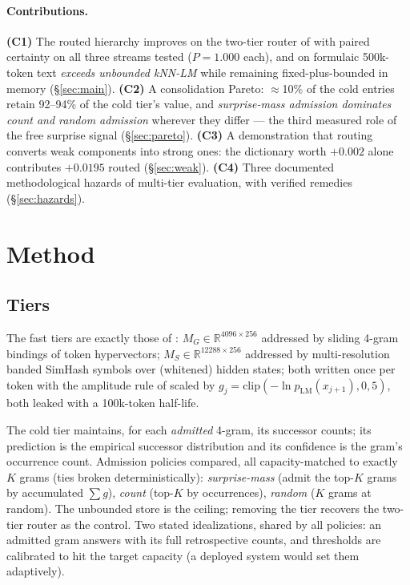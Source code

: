 \documentclass[11pt]{article}
\begin{document}
\paragraph{Contributions.}
\textbf{(C1)} The routed hierarchy improves on the two-tier router of \cite{router} with paired certainty on all three streams tested ($P = 1.000$ each), and on formulaic 500k-token text \emph{exceeds unbounded kNN-LM} while remaining fixed-plus-bounded in memory (\S\ref{sec:main}).
\textbf{(C2)} A consolidation Pareto: $\approx$10\% of the cold entries retain 92--94\% of the cold tier's value, and \emph{surprise-mass admission dominates count and random admission} wherever they differ --- the third measured role of the free surprise signal (\S\ref{sec:pareto}).
\textbf{(C3)} A demonstration that routing converts weak components into strong ones: the dictionary worth $+0.002$ alone contributes $+0.0195$ routed (\S\ref{sec:weak}).
\textbf{(C4)} Three documented methodological hazards of multi-tier evaluation, with verified remedies (\S\ref{sec:hazards}).

\section{Method}

\subsection{Tiers}

The fast tiers are exactly those of \cite{router}: $M_G \in \mathbb{R}^{4096\times256}$ addressed by sliding 4-gram bindings of token hypervectors; $M_S \in \mathbb{R}^{12288\times256}$ addressed by multi-resolution banded SimHash symbols over (whitened) hidden states; both written once per token with the amplitude rule of \cite{sillage} scaled by $g_j = \mathrm{clip}(-\ln p_{\mathrm{LM}}(x_{j+1}), 0, 5)$, both leaked with a 100k-token half-life.

The cold tier maintains, for each \emph{admitted} 4-gram, its successor counts; its prediction is the empirical successor distribution and its confidence is the gram's occurrence count. Admission policies compared, all capacity-matched to exactly $K$ grams (ties broken deterministically):
\emph{surprise-mass} (admit the top-$K$ grams by accumulated $\sum g$), \emph{count} (top-$K$ by occurrences), \emph{random} ($K$ grams at random). The unbounded store is the ceiling; removing the tier recovers the two-tier router as the control. Two stated idealizations, shared by all policies: an admitted gram answers with its full retrospective counts, and thresholds are calibrated to hit the target capacity (a deployed system would set them adaptively).
\end{document}

